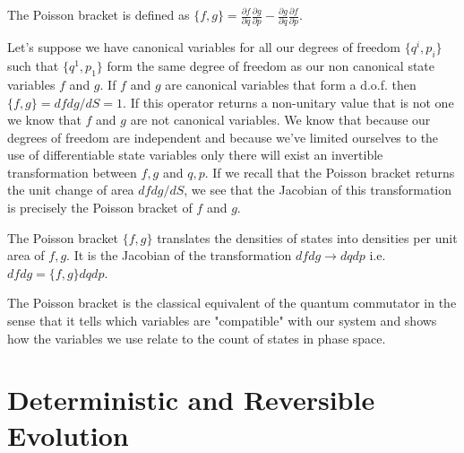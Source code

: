 \documentclass{article}
\begin{document}
\begin{defn}
	The Poisson bracket is defined as $\{f,g\} = \frac{\partial f}{\partial q}\frac{\partial g}{\partial p} - \frac{\partial g}{\partial q}\frac{\partial f}{\partial p}$.
\end{defn}

	Let's suppose we have canonical variables for all our degrees of freedom $\{q^i,p_i\}$ such that $\{q^1,p_1\}$ form the same degree of freedom as our non canonical state variables $f$ and $g$. If $f$ and $g$ are canonical variables that form a d.o.f. then $\{f,g \} = dfdg/dS = 1$. If this operator returns a non-unitary value that is not one we know that $f$ and $g$ are not canonical variables. We know that because our degrees of freedom are independent and because we've limited ourselves to the use of differentiable state variables only there will exist an invertible transformation between $f,g$ and $q,p$. If we recall that the Poisson bracket returns the unit change of area $dfdg/dS$, we see that the Jacobian of this transformation is precisely the Poisson bracket of $f$ and $g$.

\begin{prop}
	The Poisson bracket $\{f, g\}$ translates the densities of states into densities per unit area of $f, g$. It is the Jacobian of the transformation $dfdg \rightarrow dqdp$ i.e. $dfdg = \{f,g\}dqdp$.
\end{prop}

	The Poisson bracket is the classical equivalent of the quantum commutator in the sense that it tells which variables are "compatible" with our system and shows how the variables we use relate to the count of states in phase space.
	
\section{Deterministic and Reversible Evolution}
\end{document}
